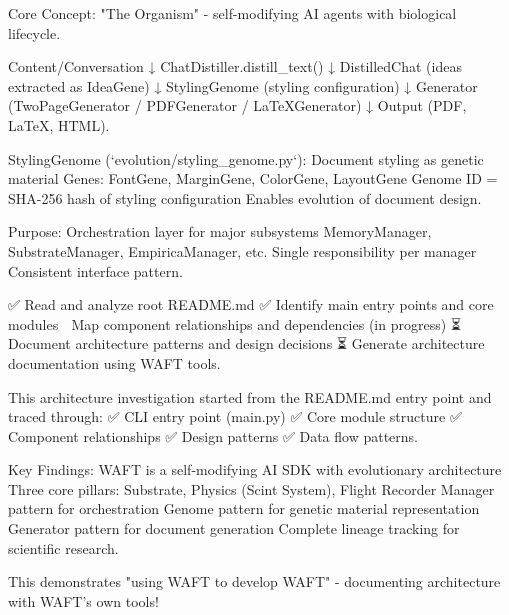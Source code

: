 \documentclass[11pt,letterpaper]{article}
\begin{document}
Core Concept: "The Organism" - self-modifying AI agents with biological lifecycle.

Content/Conversation ↓ ChatDistiller.distill\_text() ↓ DistilledChat (ideas extracted as IdeaGene) ↓ StylingGenome (styling configuration) ↓ Generator (TwoPageGenerator / PDFGenerator / LaTeXGenerator) ↓ Output (PDF, LaTeX, HTML).

StylingGenome (`evolution/styling\_genome.py`): Document styling as genetic material Genes: FontGene, MarginGene, ColorGene, LayoutGene Genome ID = SHA-256 hash of styling configuration Enables evolution of document design.

Purpose: Orchestration layer for major subsystems MemoryManager, SubstrateManager, EmpiricaManager, etc. Single responsibility per manager Consistent interface pattern.

✅ Read and analyze root README.md ✅ Identify main entry points and core modules 🔄 Map component relationships and dependencies (in progress) ⏳ Document architecture patterns and design decisions ⏳ Generate architecture documentation using WAFT tools.

This architecture investigation started from the README.md entry point and traced through: ✅ CLI entry point (main.py) ✅ Core module structure ✅ Component relationships ✅ Design patterns ✅ Data flow patterns.

Key Findings: WAFT is a self-modifying AI SDK with evolutionary architecture Three core pillars: Substrate, Physics (Scint System), Flight Recorder Manager pattern for orchestration Genome pattern for genetic material representation Generator pattern for document generation Complete lineage tracking for scientific research.

This demonstrates "using WAFT to develop WAFT" - documenting architecture with WAFT's own tools!
\end{document}
